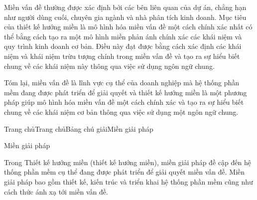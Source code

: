 Miền vấn đề thường được xác định bởi các bên liên quan của dự án, chẳng hạn như người dùng cuối, chuyên gia ngành và nhà phân tích kinh doanh. Mục tiêu của thiết kế hướng miền là mô hình hóa miền vấn đề một cách chính xác nhất có thể bằng cách tạo ra một mô hình miền phản ánh chính xác các khái niệm và quy trình kinh doanh cơ bản. Điều này đạt được bằng cách xác định các khái niệm và khái niệm trừu tượng chính trong miền vấn đề và tạo ra sự hiểu biết chung về các khái niệm này thông qua việc sử dụng ngôn ngữ chung.

Tóm lại, miền vấn đề là lĩnh vực cụ thể của doanh nghiệp mà hệ thống phần mềm đang được phát triển để giải quyết và thiết kế hướng miền là một phương pháp giúp mô hình hóa miền vấn đề một cách chính xác và tạo ra sự hiểu biết chung về các khái niệm cơ bản thông qua việc sử dụng một ngôn ngữ chung.









Trang chủTrang chủBảng chú giảiMiền giải pháp

Miền giải pháp

Trong Thiết kế hướng miền (thiết kế hướng miền), miền giải pháp đề cập đến hệ thống phần mềm cụ thể đang được phát triển để giải quyết miền vấn đề. Miền giải pháp bao gồm thiết kế, kiến trúc và triển khai hệ thống phần mềm cũng như cách thức ánh xạ tới miền vấn đề.

